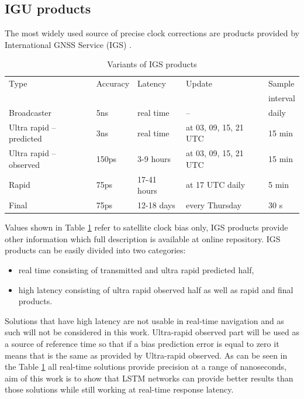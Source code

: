 \documentclass{kybernetika}
\begin{document}
\subsection{IGU products}
The most widely used source of precise clock corrections are products provided 
by International GNSS Service (IGS) \cite{Kouba2009}.
\begin{table}[ht] 
	\centering
	\caption{Variants of IGS products}
	\label{tab:igs_products}
	\begin{tabular*}{\textwidth}{*{5}{l}}
		\hline
		\hline
		Type& Accuracy& Latency& Update& Sample \\
		&&&&interval\\
		\hline
		Broadcaster & 5ns & real time & -- & daily  \\
		Ultra rapid -- predicted & 3ns & real time & at 03, 09, 15, 21 UTC & 15 min  \\
		Ultra rapid -- observed & 150ps & 3-9 hours & at 03, 09, 15, 21 UTC & 15 min  \\
		Rapid & 75ps & 17-41 hours & at 17 UTC daily & 5 min \\
		Final & 75ps & 12-18 days & every Thursday & 30 s \\
		\hline
		\hline
	\end{tabular*}
\end{table}
Values shown in Table \ref{tab:igs_products} refer to satellite clock bias only,  IGS products
provide other information which full description  is available at online repository. 
IGS products can be easily divided into two categories:
\begin{itemize}
	\item real time consisting of transmitted and ultra rapid predicted half,
	\item high latency consisting of ultra rapid observed half as well as rapid and final products.
\end{itemize}
Solutions that have high latency are not usable in real-time navigation and as such will not be
considered in this work. Ultra-rapid observed part will be used as a source of
reference time so that if a bias prediction error is equal to zero it means that is
the same as provided by Ultra-rapid observed.
As can be seen in the Table \ref{tab:igs_products} all real-time solutions provide precision 
at a range of nanoseconds, aim of this work is to show that LSTM networks can provide 
better results than those solutions while still working at real-time response latency.

\end{document}
